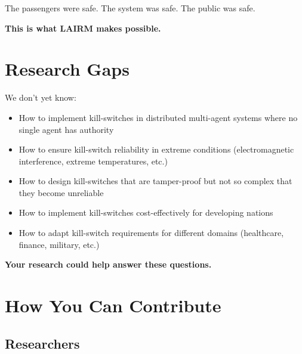 The passengers were safe. The system was safe. The public was safe.

\textbf{This is what LAIRM makes possible.}

\vspace{0.5cm}

\section{Research Gaps}

We don't yet know:

\begin{itemize}
    \item How to implement kill-switches in distributed multi-agent systems where no single agent has authority
    
    \item How to ensure kill-switch reliability in extreme conditions (electromagnetic interference, extreme temperatures, etc.)
    
    \item How to design kill-switches that are tamper-proof but not so complex that they become unreliable
    
    \item How to implement kill-switches cost-effectively for developing nations
    
    \item How to adapt kill-switch requirements for different domains (healthcare, finance, military, etc.)
\end{itemize}

\textbf{Your research could help answer these questions.}

\vspace{0.5cm}

\section{How You Can Contribute}

\subsection{Researchers}

